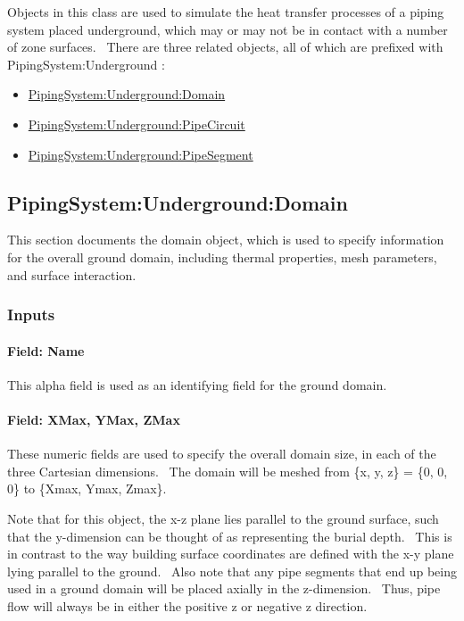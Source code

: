 Objects in this class are used to simulate the heat transfer processes of a piping system placed underground, which may or may not be in contact with a number of zone surfaces.~ There are three related objects, all of which are prefixed with PipingSystem:Underground :

\begin{itemize}
\item
  \hyperref[pipingsystemundergrounddomain]{PipingSystem:Underground:Domain}
\item
  \hyperref[pipingsystemundergroundpipecircuit]{PipingSystem:Underground:PipeCircuit}
\item
  \hyperref[pipingsystemundergroundpipesegment]{PipingSystem:Underground:PipeSegment}
\end{itemize}

\subsection{PipingSystem:Underground:Domain}\label{pipingsystemundergrounddomain}

This section documents the domain object, which is used to specify information for the overall ground domain, including thermal properties, mesh parameters, and surface interaction.

\subsubsection{Inputs}\label{inputs-9-011}

\paragraph{Field: Name}\label{field-name-9-010}

This alpha field is used as an identifying field for the ground domain.

\paragraph{Field: XMax, YMax, ZMax}\label{field-xmax-ymax-zmax}

These numeric fields are used to specify the overall domain size, in each of the three Cartesian dimensions.~ The domain will be meshed from \{x, y, z\} = \{0, 0, 0\} to \{Xmax, Ymax, Zmax\}.

Note that for this object, the x-z plane lies parallel to the ground surface, such that the y-dimension can be thought of as representing the burial depth.~ This is in contrast to the way building surface coordinates are defined with the x-y plane lying parallel to the ground.~ Also note that any pipe segments that end up being used in a ground domain will be placed axially in the z-dimension.~ Thus, pipe flow will always be in either the positive z or negative z direction.

